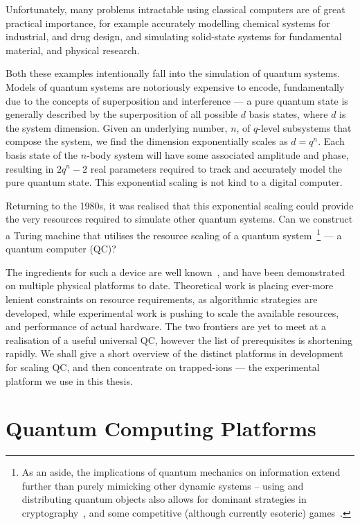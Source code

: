 Unfortunately, many problems intractable using classical computers are of great
practical importance, for example accurately modelling chemical systems for
industrial, and drug design, and simulating solid-state systems for fundamental
material, and physical research.

Both these examples intentionally fall into the simulation of quantum systems.
Models of quantum systems are notoriously expensive to encode, 
fundamentally due to
the concepts of superposition and interference --- a pure quantum state is generally
described by the superposition of all possible $d$ basis states, where $d$ is
the system dimension. Given an underlying number, $n$, of $q$-level subsystems that compose the system, we find the dimension exponentially scales as $d=q^n$. Each basis state of the $n$-body system will have some
associated amplitude and phase, resulting in $2q^n-2$ real
parameters required to track and accurately model the pure quantum state. This
exponential scaling is not kind to a digital computer.

Returning to the 1980s, it was realised that this exponential scaling could provide the very resources required to simulate other quantum systems. Can we construct a Turing
machine that utilises the resource scaling of a quantum system~\cite{deutsch_quantum_1985}\footnote{As an
aside, the implications of quantum mechanics on information
extend further than purely mimicking other dynamic systems -- using and
distributing quantum objects also allows for dominant strategies in
cryptography~\cite{bennett_quantum_2014}, and some competitive (although currently esoteric)
games~\cite{drmota_experimental_2025}.} --- a quantum computer (QC)? 

The ingredients for such a device are well
known~\cite{divincenzo_physical_2000}, and have been demonstrated on multiple
physical platforms to date. Theoretical work is placing ever-more lenient
constraints on resource requirements, as algorithmic strategies are developed,
while experimental work is pushing to scale the available resources, and
performance of actual hardware. The two frontiers are yet to meet at a
realisation of a useful universal QC, however the list of prerequisites is
shortening rapidly.
 We shall give a short overview of the distinct platforms in
development for scaling QC, and then concentrate on trapped-ions  --- the
experimental platform we use in this thesis.

\section{Quantum Computing Platforms}

